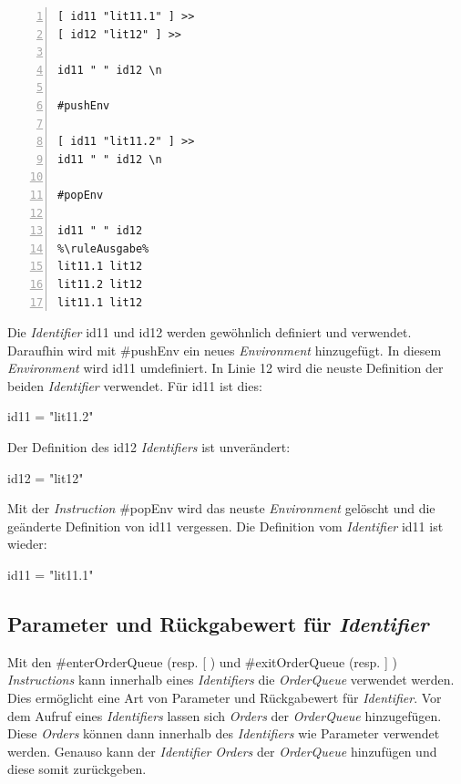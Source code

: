 \begin{minipage}{\linewidth}
\begin{multicols}{2}
\begin{lstlisting}[language=QHS, caption=Beispiel zu \textit{Environments}, numbers=left, stepnumber=1]
%\ruleEingabe%
[ id11 "lit11.1" ] >>
[ id12 "lit12" ] >>

id11 " " id12 \n

#pushEnv

[ id11 "lit11.2" ] >>
id11 " " id12 \n

#popEnv

id11 " " id12
%\ruleAusgabe%
lit11.1 lit12
lit11.2 lit12
lit11.1 lit12
\end{lstlisting}
\columnbreak
Die \textit{Identifier} {\selectListingFont id11} und {\selectListingFont id12} werden gewöhnlich definiert und verwendet. Daraufhin wird mit {\selectListingFont \#pushEnv} ein neues \textit{Environment} hinzugefügt.
In diesem \textit{Environment} wird {\selectListingFont id11} umdefiniert. In Linie 12 wird die neuste Definition der beiden \textit{Identifier} verwendet. Für {\selectListingFont id11} ist dies: \break
\centerline{\selectListingFont id11 = "lit11.2"}
Der Definition des {\selectListingFont id12} \textit{Identifiers} ist unverändert: \break
\centerline{\selectListingFont id12 = "lit12"}
Mit der \textit{Instruction} {\selectListingFont \#popEnv} wird das neuste \textit{Environment} gelöscht und die geänderte Definition von {\selectListingFont id11} vergessen.
Die Definition vom \textit{Identifier} {\selectListingFont id11} ist wieder:
\centerline{\selectListingFont id11 = "lit11.1"}
\end{multicols}
\end{minipage}



\subsection{Parameter und Rückgabewert für \textit{Identifier}}
Mit den {\listingFont\selectfont \#enterOrderQueue} (resp. {\listingFont\selectfont [} ) und {\listingFont\selectfont \#exitOrderQueue} (resp. {\listingFont\selectfont ]} ) \textit{Instructions}
kann innerhalb eines \textit{Identifiers} die \textit{OrderQueue} verwendet werden.
Dies ermöglicht eine Art von Parameter und Rückgabewert für \textit{Identifier}.
Vor dem Aufruf eines \textit{Identifiers} lassen sich \textit{Orders} der \textit{OrderQueue} hinzugefügen. Diese \textit{Orders} können dann innerhalb des \textit{Identifiers} wie Parameter verwendet werden.
Genauso kann der \textit{Identifier} \textit{Orders} der \textit{OrderQueue} hinzufügen und diese somit zurückgeben.

